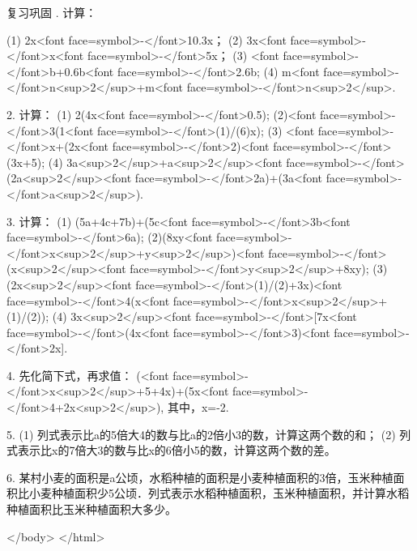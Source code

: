 	    \endexercise
         复习巩固
         . 计算：
         	
         	(1) 2x<font face=symbol>-</font>10.3x；     (2) 3x<font face=symbol>-</font>x<font face=symbol>-</font>5x；
         	(3) <font face=symbol>-</font>b+0.6b<font face=symbol>-</font>2.6b;  (4) m<font face=symbol>-</font>n<sup>2</sup>+m<font face=symbol>-</font>n<sup>2</sup>.
         	
         	2. 计算：
         	(1) 2(4x<font face=symbol>-</font>0.5);           (2)<font face=symbol>-</font>3(1<font face=symbol>-</font>(1)/(6)x);
         	(3) <font face=symbol>-</font>x+(2x<font face=symbol>-</font>2)<font face=symbol>-</font>(3x+5);    (4) 3a<sup>2</sup>+a<sup>2</sup><font face=symbol>-</font>(2a<sup>2</sup><font face=symbol>-</font>2a)+(3a<font face=symbol>-</font>a<sup>2</sup>).
         	
         	3. 计算：
            (1) (5a+4c+7b)+(5c<font face=symbol>-</font>3b<font face=symbol>-</font>6a);         (2)(8xy<font face=symbol>-</font>x<sup>2</sup>+y<sup>2</sup>)<font face=symbol>-</font>(x<sup>2</sup><font face=symbol>-</font>y<sup>2</sup>+8xy);
            (3) (2x<sup>2</sup><font face=symbol>-</font>(1)/(2)+3x)<font face=symbol>-</font>4(x<font face=symbol>-</font>x<sup>2</sup>+(1)/(2));    (4) 3x<sup>2</sup><font face=symbol>-</font>[7x<font face=symbol>-</font>(4x<font face=symbol>-</font>3)<font face=symbol>-</font>2x].
            
            4. 先化简下式，再求值：
                     (<font face=symbol>-</font>x<sup>2</sup>+5+4x)+(5x<font face=symbol>-</font>4+2x<sup>2</sup>),
                其中，x=-2.
            
            5. (1) 列式表示比a的5倍大4的数与比a的2倍小3的数，计算这两个数的和；
               (2) 列式表示比x的7倍大3的数与比x的6倍小5的数，计算这两个数的差。
            
            6. 某村小麦的面积是a公顷，水稻种植的面积是小麦种植面积的3倍，玉米种植面积比小麦种植面积少5公顷．列式表示水稻种植面积，玉米种植面积，并计算水稻种植面积比玉米种植面积大多少。
          	
         \endexercise
	\endarticle
\enddocument</body>
</html>
